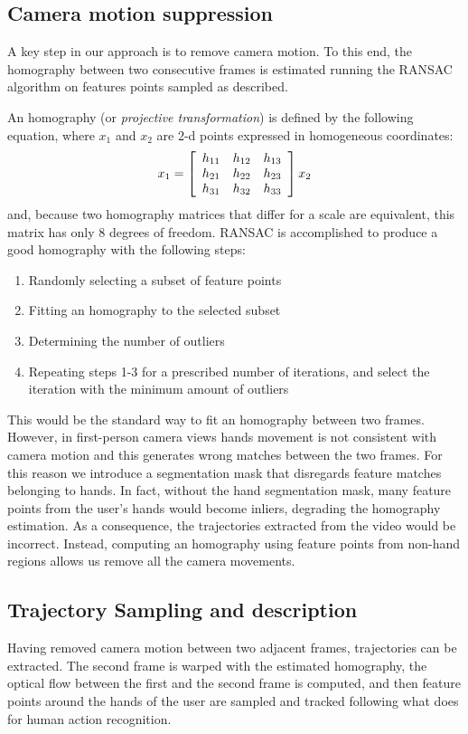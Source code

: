 \subsection{Camera motion suppression}
A key step in our approach is to remove camera motion. To this end, the homography between two consecutive frames is estimated running the RANSAC algorithm on features points sampled as described. 

An homography (or \textit{projective transformation}) is defined by the following equation, where $x_1$ and $x_2$ are 2-d points expressed in homogeneous coordinates:
$$
x_1 = \left[\begin{array}{c c c}
 h_{11} & h_{12} & h_{13} \\
 h_{21} & h_{22} & h_{23} \\
 h_{31} & h_{32} & h_{33}
 \end{array}\right] x_2
$$
and, because two homography matrices that differ for a scale are equivalent, this matrix has only 8 degrees of freedom. RANSAC is accomplished to produce a good homography with the following steps:
\begin{enumerate}
\item Randomly selecting a subset of feature points
\item Fitting an homography to the selected subset
\item Determining the number of outliers
\item Repeating steps 1-3 for a prescribed number of iterations, and select the iteration with the minimum amount of outliers
\end{enumerate}

This would be the standard way to fit an homography between two frames. However, in first-person camera views hands movement is not consistent with camera motion and this generates wrong matches between the two frames. For this reason we introduce a segmentation mask that disregards feature matches belonging to hands. In fact, without the hand segmentation mask, many feature points from the user's hands would become inliers, degrading the homography estimation. As a consequence, the trajectories extracted from the video would be incorrect. Instead, computing an homography using feature points from non-hand regions allows us remove all the camera movements.

\subsection{Trajectory Sampling and description}
Having removed camera motion between two adjacent frames, trajectories can be extracted. The second frame is warped with the estimated homography, the optical flow between the first and the second frame is computed, and then feature points around the hands of the user are sampled and tracked following what \cite{wang:2011:inria-00583818:1} does for human action recognition.

